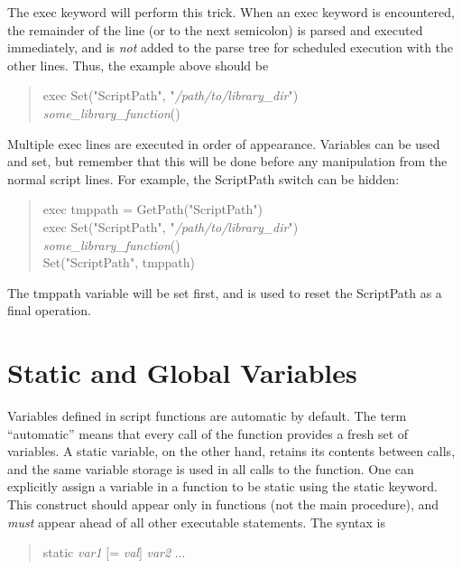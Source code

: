 The {\vt exec} keyword will perform this trick.  When an {\vt exec}
keyword is encountered, the remainder of the line (or to the next
semicolon) is parsed and executed immediately, and is {\it not} added
to the parse tree for scheduled execution with the other lines.  Thus,
the example above should be

\begin{quote}
{\vt exec Set("ScriptPath", "}{\it /path/to/library\_dir\/}{\vt ")}\\
{\it some\_library\_function\/}{\vt ()}
\end{quote}

Multiple {\vt exec} lines are executed in order of appearance. 
Variables can be used and set, but remember that this will be done
before any manipulation from the normal script lines.  For example,
the {\et ScriptPath} switch can be hidden:

\begin{quote}
{\vt exec tmppath = GetPath("ScriptPath")}\\
{\vt exec Set("ScriptPath", "}{\it /path/to/library\_dir\/}{\vt ")}\\
{\it some\_library\_function\/}{\vt ()}\\
{\vt Set("ScriptPath", tmppath)}
\end{quote}

The {\vt tmppath} variable will be set first, and is used to reset the
{\et ScriptPath} as a final operation.


\section{Static and Global Variables}
\label{static}

Variables defined in script functions are automatic by default.  The
term ``automatic'' means that every call of the function provides a
fresh set of variables.  A static variable, on the other hand, retains
its contents between calls, and the same variable storage is used in
all calls to the function.  One can explicitly assign a variable in a
function to be static using the {\vt static} keyword.  This construct
should appear only in functions (not the main procedure), and {\it
must} appear ahead of all other executable statements.  The syntax is

\begin{quote}
{\vt static {\it var1} [= {\it val\/}] {\it var2}} ...
\end{quote}

